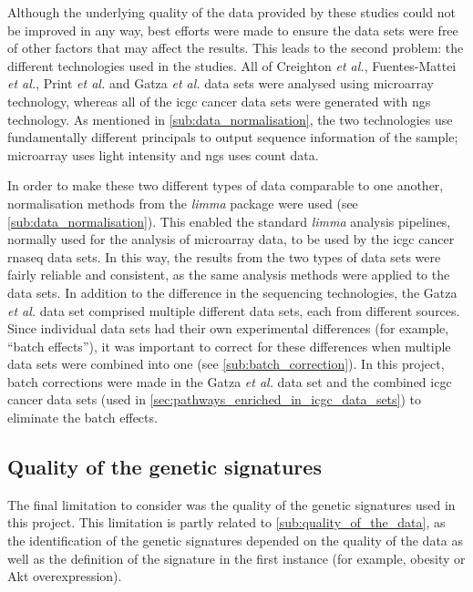 Although the underlying quality of the data provided by these studies could not be improved in any way, best efforts were made to  ensure the data sets were free of other factors that may affect the results.
This leads to the second problem: the different technologies used in the studies.
All of Creighton \textit{et al.}, Fuentes-Mattei \textit{et al.}, Print \textit{et al.} and Gatza \textit{et al.} data sets were analysed using microarray technology, whereas all of the \gls{icgc} cancer data sets were generated with \gls{ngs} technology.
As mentioned in \cref{sub:data_normalisation}, the two technologies use fundamentally different principals to output sequence information of the sample; microarray uses light intensity and \gls{ngs} uses count data.

In order to make these two different types of data comparable to one another, normalisation methods from the \textit{limma} package were used (see \cref{sub:data_normalisation}).
This enabled the standard \textit{limma} analysis pipelines, normally used for the analysis of microarray data, to be used by the \gls{icgc} cancer \gls{rnaseq} data sets.
In this way, the results from the two types of data sets were fairly reliable and consistent, as the same analysis methods were applied to the data sets.
In addition to the difference in the sequencing technologies, the Gatza \textit{et al.} data set comprised multiple different data sets, each from different sources.
Since individual data sets had their own experimental differences (for example, ``batch effects''), it was important to correct for these differences when multiple data sets were combined into one (see \cref{sub:batch_correction}).
In this project, batch corrections were made in the Gatza \textit{et al.} data set and the combined \gls{icgc} cancer data sets (used in \cref{sec:pathways_enriched_in_icgc_data_sets}) to eliminate the batch effects.

\subsection{Quality of the genetic signatures}
\label{sub:quality_of_the_genetic_signatures}

The final limitation to consider was the quality of the genetic signatures used in this project.
This limitation is partly related to \cref{sub:quality_of_the_data}, as  the identification of the  genetic signatures depended  on the quality of the data as well as the definition  of the signature in the first instance (for example,  obesity or Akt overexpression).

